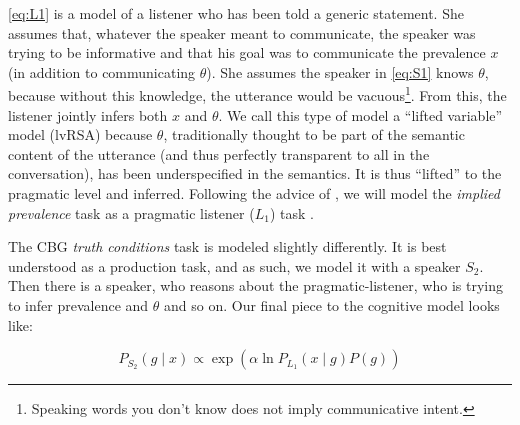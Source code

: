 \documentclass[10pt,letterpaper]{article}
\begin{document}
%
%			
%			
%			
%			
%			
%			
%			

\eqref{eq:L1} is a model of a listener who has been told a generic statement. She assumes that, whatever the speaker meant to communicate, the speaker was trying to be informative and that his goal was to communicate the prevalence $x$ (in addition to communicating $\theta$). She assumes the speaker in \eqref{eq:S1} knows $\theta$, because without this knowledge, the utterance would be vacuous\footnote{Speaking words you don't know does not imply communicative intent.}.  From this, the listener jointly infers both $x$ and $\theta$. We call this type of model a ``lifted variable'' model (lvRSA) because $\theta$, traditionally thought to be part of the semantic content of the utterance (and thus perfectly transparent to all in the conversation), has been underspecified in the semantics. It is thus ``lifted'' to the pragmatic level and inferred. Following the advice of , we will model the \emph{implied prevalence} task as a pragmatic listener ($L_{1}$) task .  

The CBG \emph{truth conditions} task is modeled slightly differently. It is best understood as a production task, and as such, we model it with a speaker $S_{2}$. Then there is a speaker, who reasons about the pragmatic-listener, who is trying to infer prevalence and $\theta$ and so on. Our final piece to the cognitive model looks like:

\begin{equation} 
P_{S_{2}}(g \mid x) \propto \exp{(\alpha \ln{P_{L_{1}}(x \mid g) P(g)})}
\label{eq:S2}
\end{equation}
\end{document}
